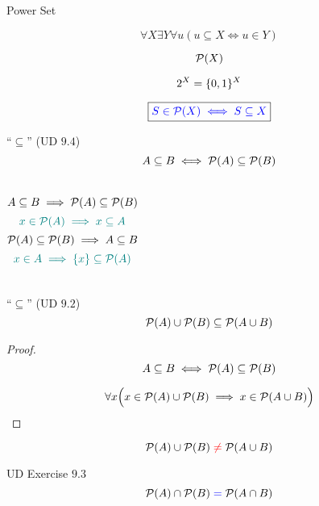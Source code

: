 \begin{frame}{}
  \centerline{\LARGE Power Set}

  \vspace{0.50cm}
\end{frame}

\begin{frame}{}
  \begin{definition}
    \[
      \forall X \exists Y \forall u (u \subseteq X \iff u \in Y )
    \]
  \end{definition}

  \[
    \mathcal{P}(X)
  \]

  \pause
  \[
    2^{X} = \{0,1\}^{X}
  \]
\end{frame}

\begin{frame}{}
  \[
    \boxed{\textcolor{blue}{S \in \mathcal{P}(X) \iff S \subseteq X}}
  \]
\end{frame}

\begin{frame}{}
  \begin{exampleblock}{``$\subseteq$'' (UD $9.4$)}
    \[
      A \subseteq B \iff \mathcal{P}(A) \subseteq \mathcal{P}(B)
    \]
  \end{exampleblock}

  \pause
  \vspace{0.60cm}
  \begin{columns}
      \[
	A \subseteq B \implies \mathcal{P}(A) \subseteq \mathcal{P}(B)
      \]
      \[
	\textcolor{teal}{x \in \mathcal{P}(A) \implies x \subseteq A}
      \]
      \[
	\mathcal{P}(A) \subseteq \mathcal{P}(B) \implies A \subseteq B
      \]
      \[
	\textcolor{teal}{x \in A \implies \{x\} \subseteq \mathcal{P}(A)}
      \]
  \end{columns}
\end{frame}

\begin{frame}{}
  \begin{exampleblock}{``$\subseteq$'' (UD $9.2$)}
    \[
      \mathcal{P}(A) \cup \mathcal{P}(B) \subseteq \mathcal{P}(A \cup B)
    \]
  \end{exampleblock}

  \pause
  \begin{proof}
    \[
      A \subseteq B \iff \mathcal{P}(A) \subseteq \mathcal{P}(B)
    \]

    \pause
    \[
      \forall x \Big(x \in \mathcal{P}(A) \cup \mathcal{P}(B) \implies x \in \mathcal{P}(A \cup B)\Big)
    \]
  \end{proof}

  \pause
  \[
    \mathcal{P}(A) \cup \mathcal{P}(B) \;\textcolor{red}{\neq}\; \mathcal{P}(A \cup B)
  \]

  \pause
  \begin{exampleblock}{UD Exercise $9.3$}
    \[
      \mathcal{P}(A) \cap \mathcal{P}(B) \;\textcolor{blue}{=}\; \mathcal{P}(A \cap B)
    \]
  \end{exampleblock}
\end{frame}
